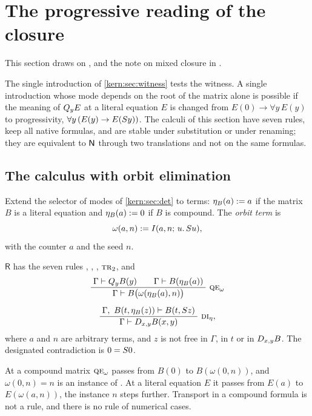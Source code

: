 \section{The progressive reading of the closure}
\label{kern:sec:prog}

This section draws on ,  and the
note on mixed closure in .

The single introduction of \cref{kern:sec:witness} tests the witness.  A
single introduction whose mode depends on the root of the matrix alone is
possible if the meaning of $Q_{y}E$ at a literal equation $E$ is changed
from $E(0)\to\forall y\,E(y)$ to progressivity,
$\forall y\,(E(y)\to E(S y))$.  The calculi of this section have seven
rules, keep all native formulas, and are stable under substitution or under
renaming; they are equivalent to $\mathsf{N}$ through two translations and not on
the same formulas.

\subsection{The calculus with orbit elimination}
\label{kern:sec:R}

Extend the selector of modes of \cref{kern:sec:det} to terms:
$\eta_B(a)\mathrel{:=} a$ if the matrix $B$ is a literal equation and
$\eta_B(a)\mathrel{:=} 0$ if $B$ is compound.  The \emph{orbit term} is
\[
 \omega(a,n)\mathrel{:=}I(a,n;\,u.\,S u),
\]
with the counter $a$ and the seed $n$.

\begin{definition}
\label{kern:def:R}
$\mathsf{R}$ has the seven rules , ,
, $\rulename{Tr}_{2}$,  and
\begin{gather*}
 \infrule{\Gamma\proves\Q{y}B(y)\qquad\Gamma\proves B(\eta_B(a))}
         {\Gamma\proves B\bigl(\omega(\eta_B(a),n)\bigr)}\
 \rulename{QE}_{\omega}
 \\[1.2ex]
 \infrule{\Gamma,\ B(t,\eta_B(z))\proves B(t,\Suc z)}
         {\Gamma\proves\D{x}{y}B(x,y)}\ \rulename{DI}_{\eta},
\end{gather*}
where $a$ and $n$ are arbitrary terms, and $z$ is not free in $\Gamma$, in
$t$ or in $D_{x,y}B$.  The designated contradiction is $0=S 0$.
\end{definition}

At a compound matrix $\rulename{QE}_{\omega}$ passes from $B(0)$ to
$B(\omega(0,n))$, and $\omega(0,n)=n$ is an instance of .  At a
literal equation $E$ it passes from $E(a)$ to $E(\omega(a,n))$, the instance
$n$ steps further.  Transport in a compound formula is not a rule, and there
is no rule of numerical cases.

